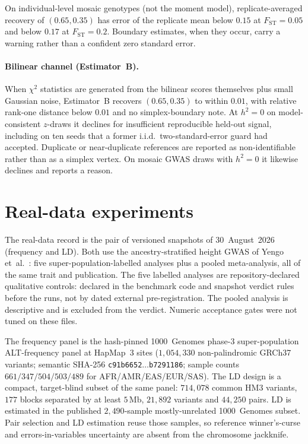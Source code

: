 \documentclass[11pt,a4paper]{article}
\begin{document}
On individual-level mosaic genotypes (not the moment model),
replicate-averaged recovery of $(0.65,0.35)$ has error of the
replicate mean below $0.15$ at $F_{\mathrm{ST}}=0.05$ and below
$0.17$ at $F_{\mathrm{ST}}=0.2$. Boundary estimates, when they
occur, carry a warning rather than a confident zero standard
error.

\paragraph{Bilinear channel (Estimator~B).}
When $\chi^2$ statistics are generated from the bilinear scores
themselves plus small Gaussian noise, Estimator~B recovers
$(0.65,0.35)$ to within $0.01$, with relative rank-one distance
below $0.01$ and no simplex-boundary note. At $h^2=0$ on
model-consistent $z$-draws it declines for insufficient
reproducible held-out signal, including on ten seeds that a former
i.i.d.\ two-standard-error guard had accepted. Duplicate or
near-duplicate references are reported as non-identifiable rather
than as a simplex vertex. On mosaic GWAS draws with $h^2=0$ it
likewise declines and reports a reason.

\section{Real-data experiments}\label{sec:realdata}

The real-data record is the pair of versioned snapshots of
30~August~2026 (frequency and LD). Both use
the ancestry-stratified height GWAS of Yengo et~al.\
\citep{yengo2022height}: five super-population-labelled analyses
plus a pooled meta-analysis, all of the same trait and publication.
The five labelled analyses are repository-declared qualitative controls:
declared in the benchmark code and snapshot verdict rules before the runs,
not by dated external pre-registration. The pooled analysis is descriptive
and is excluded from the verdict. Numeric acceptance gates were not tuned
on these files.

The frequency panel is the hash-pinned 1000~Genomes phase-3
super-population ALT-frequency panel at HapMap~3 sites
($1{,}054{,}330$ non-palindromic GRCh37 variants; semantic SHA-256
\texttt{c91b6652$\ldots$b7291186}; sample counts $661/347/504/503/489$
for AFR/AMR/EAS/EUR/SAS). The LD design is a compact, target-blind
subset of the same panel: $714{,}078$ common HM3 variants, $177$
blocks separated by at least $5\,\mathrm{Mb}$, $21{,}892$ variants
and $44{,}250$ pairs. LD is estimated in the published $2{,}490$-sample
mostly-unrelated 1000~Genomes subset. Pair selection and LD
estimation reuse those samples, so reference winner's-curse and
errors-in-variables uncertainty are absent from the chromosome
jackknife.
\end{document}
